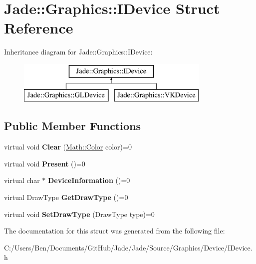 \hypertarget{struct_jade_1_1_graphics_1_1_i_device}{}\section{Jade\+:\+:Graphics\+:\+:I\+Device Struct Reference}
\label{struct_jade_1_1_graphics_1_1_i_device}
Inheritance diagram for Jade\+:\+:Graphics\+:\+:I\+Device\+:\begin{figure}[H]
\begin{center}
\leavevmode
\includegraphics[height=2.000000cm]{struct_jade_1_1_graphics_1_1_i_device}
\end{center}
\end{figure}
\subsection*{Public Member Functions}
\begin{DoxyCompactItemize}
\item 
\hypertarget{struct_jade_1_1_graphics_1_1_i_device_ab898bda6f3b99c18b4c4dd939ec3b138}{}virtual void {\bfseries Clear} (\hyperlink{struct_jade_1_1_math_1_1_color}{Math\+::\+Color} color)=0\label{struct_jade_1_1_graphics_1_1_i_device_ab898bda6f3b99c18b4c4dd939ec3b138}

\item 
\hypertarget{struct_jade_1_1_graphics_1_1_i_device_a67c38c0ca3031f1e959cf569ba25fec3}{}virtual void {\bfseries Present} ()=0\label{struct_jade_1_1_graphics_1_1_i_device_a67c38c0ca3031f1e959cf569ba25fec3}

\item 
\hypertarget{struct_jade_1_1_graphics_1_1_i_device_a4ef23421fe5c8bcd09731a1d38eda78f}{}virtual char $\ast$ {\bfseries Device\+Information} ()=0\label{struct_jade_1_1_graphics_1_1_i_device_a4ef23421fe5c8bcd09731a1d38eda78f}

\item 
\hypertarget{struct_jade_1_1_graphics_1_1_i_device_adfb99048b86d84468d8157e746111717}{}virtual Draw\+Type {\bfseries Get\+Draw\+Type} ()=0\label{struct_jade_1_1_graphics_1_1_i_device_adfb99048b86d84468d8157e746111717}

\item 
\hypertarget{struct_jade_1_1_graphics_1_1_i_device_a5b1109e1f10a1001bd879d56a52647fd}{}virtual void {\bfseries Set\+Draw\+Type} (Draw\+Type type)=0\label{struct_jade_1_1_graphics_1_1_i_device_a5b1109e1f10a1001bd879d56a52647fd}

\end{DoxyCompactItemize}


The documentation for this struct was generated from the following file\+:\begin{DoxyCompactItemize}
\item 
C\+:/\+Users/\+Ben/\+Documents/\+Git\+Hub/\+Jade/\+Jade/\+Source/\+Graphics/\+Device/I\+Device.\+h\end{DoxyCompactItemize}

